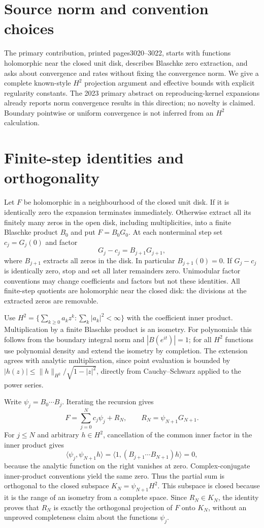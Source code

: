 \documentclass[11pt]{article}
\begin{document}
\section{Source norm and convention choices}
The primary contribution, printed pages3020--3022, starts with
functions holomorphic near the closed unit disk, describes
Blaschke zero extraction, and asks about convergence and rates
without fixing the convergence norm. We give a complete
known-style $H^2$ projection argument and effective bounds with
explicit regularity constants. The 2023 primary abstract on
reproducing-kernel expansions already reports norm convergence
results in this direction; no novelty is claimed. Boundary
pointwise or uniform convergence is not inferred from an $H^2$
calculation.

\section{Finite-step identities and orthogonality}
Let $F$ be holomorphic in a neighbourhood of the closed unit
disk. If it is identically zero the expansion terminates
immediately. Otherwise extract all its finitely many zeros in
the open disk, including multiplicities, into a finite Blaschke
product $B_0$ and put $F=B_0G_0$. At each nonterminal step
set $c_j=G_j(0)$ and factor
\[
 G_j-c_j=B_{j+1}G_{j+1},
\]
where $B_{j+1}$ extracts all zeros in the disk. In particular
$B_{j+1}(0)=0$. If $G_j-c_j$ is identically zero, stop and
set all later remainders zero. Unimodular factor conventions
may change coefficients and factors but not these identities.
All finite-step quotients are holomorphic near the closed disk:
the divisions at the extracted zeros are removable.

Use $H^2=\{\sum_{k\ge0}a_kz^k:\sum_k|a_k|^2<\infty\}$
with the coefficient inner product. Multiplication by a finite
Blaschke product is an isometry. For polynomials this follows
from the boundary integral norm and $|B(e^{it})|=1$; for all
$H^2$ functions use polynomial density and extend the isometry
by completion. The extension agrees with analytic multiplication,
since point evaluation is bounded by
$|h(z)|\le\|h\|_{H^2}/\sqrt{1-|z|^2}$, directly from
Cauchy--Schwarz applied to the power series.

Write $\psi_j=B_0\cdots B_j$. Iterating the recursion gives
\[
 F=\sum_{j=0}^N c_j\psi_j+R_N,
 \qquad R_N=\psi_{N+1}G_{N+1}.
\]
For $j\le N$ and arbitrary $h\in H^2$, cancellation of the
common inner factor in the inner product gives
\[
 \langle\psi_j,\psi_{N+1}h\rangle
 =\langle1,(B_{j+1}\cdots B_{N+1})h\rangle=0,
\]
because the analytic function on the right vanishes at zero.
Complex-conjugate inner-product conventions yield the same zero.
Thus the partial sum is orthogonal to the closed subspace
$K_N=\psi_{N+1}H^2$. This subspace is closed because it is the
range of an isometry from a complete space. Since $R_N\in K_N$,
the identity proves that $R_N$ is exactly the orthogonal
projection of $F$ onto $K_N$, without an unproved completeness
claim about the functions $\psi_j$.
\end{document}
